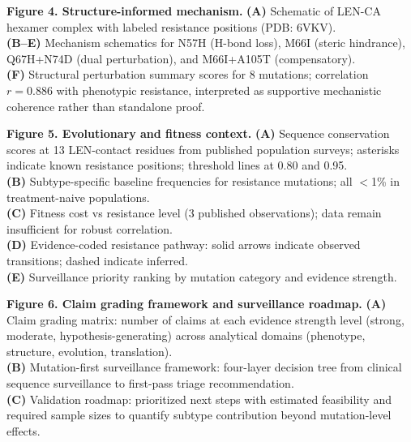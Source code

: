\documentclass[preprint]{elsarticle}
\begin{document}
\textbf{Figure 4. Structure-informed mechanism.}
\textbf{(A)} Schematic of LEN-CA hexamer complex with labeled resistance positions (PDB: 6VKV).\\
\textbf{(B--E)} Mechanism schematics for N57H (H-bond loss), M66I (steric hindrance), Q67H+N74D (dual perturbation), and M66I+A105T (compensatory).\\
\textbf{(F)} Structural perturbation summary scores for 8 mutations; correlation $r=0.886$ with phenotypic resistance, interpreted as supportive mechanistic coherence rather than standalone proof.

\textbf{Figure 5. Evolutionary and fitness context.}
\textbf{(A)} Sequence conservation scores at 13 LEN-contact residues from published population surveys; asterisks indicate known resistance positions; threshold lines at 0.80 and 0.95.\\
\textbf{(B)} Subtype-specific baseline frequencies for resistance mutations; all $<$1\% in treatment-naive populations.\\
\textbf{(C)} Fitness cost vs resistance level (3 published observations); data remain insufficient for robust correlation.\\
\textbf{(D)} Evidence-coded resistance pathway: solid arrows indicate observed transitions; dashed indicate inferred.\\
\textbf{(E)} Surveillance priority ranking by mutation category and evidence strength.

\textbf{Figure 6. Claim grading framework and surveillance roadmap.}
\textbf{(A)} Claim grading matrix: number of claims at each evidence strength level (strong, moderate, hypothesis-generating) across analytical domains (phenotype, structure, evolution, translation).\\
\textbf{(B)} Mutation-first surveillance framework: four-layer decision tree from clinical sequence surveillance to first-pass triage recommendation.\\
\textbf{(C)} Validation roadmap: prioritized next steps with estimated feasibility and required sample sizes to quantify subtype contribution beyond mutation-level effects.
\end{document}

